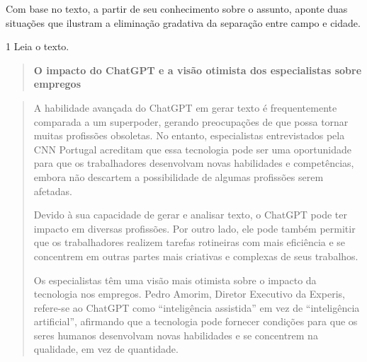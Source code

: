 
Com base no texto, a partir de seu conhecimento sobre o assunto, aponte
duas situações que ilustram a eliminação gradativa da separação entre
campo e cidade.



\num{1} Leia o texto.

\begin{quote}
\textbf{O impacto do ChatGPT e a visão otimista dos especialistas sobre
empregos}
\end{quote}

\begin{quote}
A habilidade avançada do ChatGPT em gerar texto é frequentemente
comparada a um superpoder, gerando preocupações de que possa tornar
muitas profissões obsoletas. No entanto, especialistas entrevistados
pela CNN Portugal acreditam que essa tecnologia pode ser uma
oportunidade para que os trabalhadores desenvolvam novas habilidades e
competências, embora não descartem a possibilidade de algumas profissões
serem afetadas.

Devido à sua capacidade de gerar e analisar texto, o ChatGPT pode ter
impacto em diversas profissões. Por outro lado, ele pode também permitir
que os trabalhadores realizem tarefas rotineiras com mais eficiência e
se concentrem em outras partes mais criativas e complexas de seus
trabalhos.

Os especialistas têm uma visão mais otimista sobre o impacto da
tecnologia nos empregos. Pedro Amorim, Diretor Executivo da Experis,
refere-se ao ChatGPT como ``inteligência assistida'' em vez de
``inteligência artificial'', afirmando que a tecnologia pode fornecer
condições para que os seres humanos desenvolvam novas habilidades e se
concentrem na qualidade, em vez de quantidade.
\end{quote}


